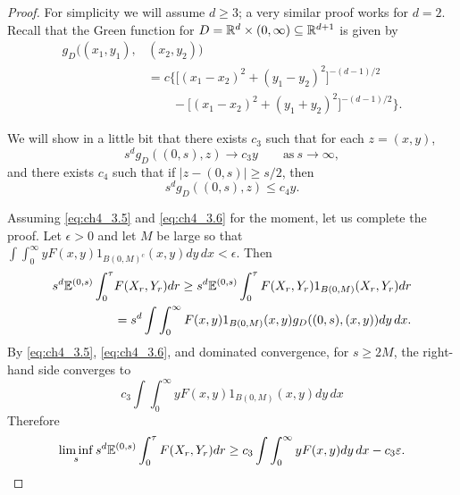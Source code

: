 \begin{proof}
For simplicity we will assume $d \geq 3$; a very similar proof works for $d = 2$. Recall that the Green function for $D = \mathbb{R}^d \times (0,\infty) \subseteq \mathbb{R}^{d+1}$ is given by
\begin{align*}
    g_D((x_1,y_1),&(x_2,y_2)) \\
    &= c\Big\{\big[(x_1-x_2)^2 + (y_1-y_2)^2\big]^{-(d-1)/2} \\
    &\qquad- \big[(x_1-x_2)^2 + (y_1+y_2)^2\big]^{-(d-1)/2}\Big\}.
\end{align*}

We will show in a little bit that there exists $c_3$ such that for each $z = (x,y)$,
\begin{equation}\label{eq:ch4_3.5}
    s^d g_D((0,s),z) \to c_3y \qquad \text{as}~s \to \infty,
\end{equation}
and there exists $c_4$ such that if $|z - (0,s)| \geq s/2$, then
\begin{equation}\label{eq:ch4_3.6}
    s^d g_D((0,s),z) \leq c_4y.
\end{equation}

Assuming \eqref{eq:ch4_3.5} and \eqref{eq:ch4_3.6} for the moment, let us complete the proof. Let $\epsilon > 0$ and let $M$ be large so that $\int\int_0^{\infty} yF(x,y)1_{B(0,M)^c}(x,y) dy\,dx < \epsilon$. Then
\begin{align*}
    s^d\mathbb{E}^{(0,s)} \int_0^{\tau} &F(X_r,Y_r)dr \geq s^d\mathbb{E}^{(0,s)} \int_0^{\tau} F(X_r,Y_r)1_{B(0,M)}(X_r,Y_r)dr \\
    &= s^d\int\int_0^{\infty} F(x,y)1_{B(0,M)}(x,y)g_D((0,s),(x,y)) dy\,dx.
\end{align*}
By \eqref{eq:ch4_3.5}, \eqref{eq:ch4_3.6}, and dominated convergence, for $s \geq 2M$, the right-hand side converges to
\[
    c_3\int\int_0^{\infty} yF(x,y)1_{B(0,M)}(x,y) dy\,dx
\]
Therefore
\begin{equation}\label{eq:ch4_3.7}
    \liminf_s s^d\mathbb{E}^{(0,s)} \int_0^{\tau} F(X_r,Y_r)dr \geq c_3\int\int_0^{\infty} yF(x,y) dy\,dx - c_3\varepsilon.
\end{equation}


\end{proof}
